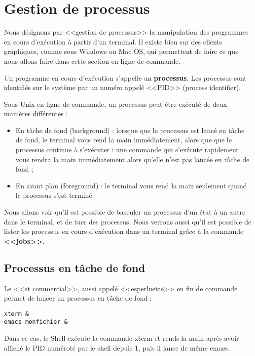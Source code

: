 \documentclass[11pt]{article}
\begin{document}
\section{Gestion de processus}

Nous désignons par <<gestion de processus>> la manipulation des programmes en cours d’exécution à partir
d’un terminal. Il existe bien sur des clients graphiques, comme sous Windows ou Mac OS, qui permettent de
faire ce que nous allons faire dans cette section en ligne de commande.

Un programme en cours d’exécution s’appelle un \textbf{processus}. Les processus sont identifiés sur le système par un numéro appelé <<PID>> (process identifier).

Sous Unix en ligne de commande, un processus peut être exécuté de deux manières différentes :

\begin{itemize}
 \item En tâche de fond (background) : lorsque que le processus est lancé en tâche de fond, le terminal
vous rend la main immédiatement, alors que que le processus continue à s’exécuter : une commande qui 
s’exécute rapidement vous rendra la main immédiatement alors qu’elle n’est pas lancée en tâche de fond ;
 \item En avant plan (foreground) : le terminal vous rend la main seulement quand le processus 
s’est terminé.
\end{itemize}

Nous allons voir qu’il est possible de basculer un processus d’un état à un autre dans le terminal, et de tuer
des processus. Nous verrons aussi qu’il est possible de lister les processus en cours d’exécution dans un
terminal grâce à la commande \textbf{<<jobs>>}.

\subsection{Processus en tâche de fond}

Le <<et commercial>>, aussi appelé <<esperluette>> en fin de commande permet de lancer un processus en tâche de fond :

\begin{lstlisting}
xterm &
emacs monfichier &
\end{lstlisting}

Dans ce cas, le Shell exécute la commande xterm et rends la main après avoir affiché le PID numéroté par le shell depuis 1, puis il lance de même emacs.
\end{document}
